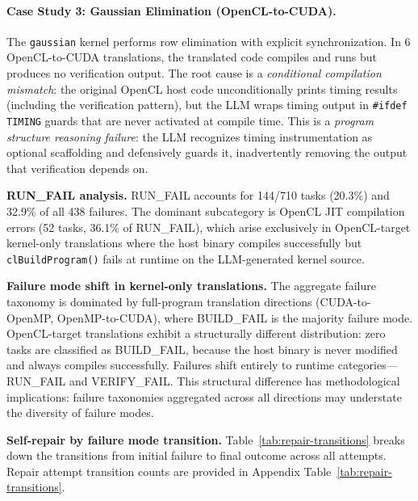 \documentclass[conference]{IEEEtran}
\newcommand{\buildfail}{\textsc{BUILD\_FAIL}}
\newcommand{\runfail}{\textsc{RUN\_FAIL}}
\newcommand{\verifyfail}{\textsc{VERIFY\_FAIL}}
\begin{document}
\paragraph{Case Study 3: Gaussian Elimination (OpenCL-to-CUDA).}
The \texttt{gaussian} kernel performs row elimination with explicit
synchronization. In 6 OpenCL-to-CUDA translations, the translated
code compiles and runs but produces no verification output.
The root cause is a \emph{conditional compilation mismatch}: the
original OpenCL host code unconditionally prints timing results
(including the verification pattern), but the LLM wraps timing
output in \texttt{\#ifdef TIMING} guards that are never activated
at compile time. This is a \emph{program structure reasoning failure}:
the LLM recognizes timing instrumentation as optional scaffolding
and defensively guards it, inadvertently removing the output
that verification depends on.

\textbf{\runfail{} analysis.} \runfail{} accounts for 144/710 tasks (20.3\%) and 32.9\% of all 438 failures. The dominant subcategory is OpenCL JIT compilation errors (52 tasks, 36.1\% of \runfail{}), which arise exclusively in OpenCL-target kernel-only translations where the host binary compiles successfully but \texttt{clBuildProgram()} fails at runtime on the LLM-generated kernel source.

\textbf{Failure mode shift in kernel-only translations.} The aggregate failure taxonomy is dominated by full-program translation directions (CUDA-to-OpenMP, OpenMP-to-CUDA), where \buildfail{} is the majority failure mode. OpenCL-target translations exhibit a structurally different distribution: zero tasks are classified as \buildfail{}, because the host binary is never modified and always compiles successfully. Failures shift entirely to runtime categories---\runfail{} and \verifyfail{}. This structural difference has methodological implications: failure taxonomies aggregated across all directions may understate the diversity of failure modes.

\textbf{Self-repair by failure mode transition.} Table~\ref{tab:repair-transitions} breaks down the transitions from initial failure to final outcome across all attempts.
Repair attempt transition counts are provided in Appendix Table~\ref{tab:repair-transitions}.
\end{document}
